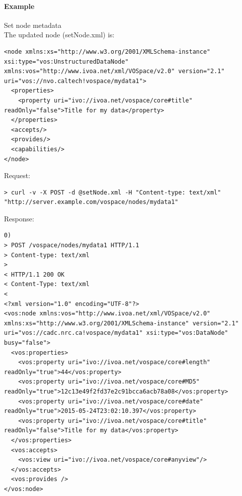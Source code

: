 \documentclass[11pt,a4paper]{ivoa}
\begin{document}
\paragraph{Example}
Set node metadata
\\[5px]
\noindent
The updated node (setNode.xml) is:
\begin{lstlisting}
<node xmlns:xs="http://www.w3.org/2001/XMLSchema-instance" xsi:type="vos:UnstructuredDataNode" xmlns:vos="http://www.ivoa.net/xml/VOSpace/v2.0" version="2.1" uri="vos://nvo.caltech!vospace/mydata1">
  <properties>
    <property uri="ivo://ivoa.net/vospace/core#title" readOnly="false">Title for my data</property>
  </properties>
  <accepts/>
  <provides/>
  <capabilities/>
</node>
\end{lstlisting}
Request:
\begin{lstlisting}
> curl -v -X POST -d @setNode.xml -H "Content-type: text/xml" "http://server.example.com/vospace/nodes/mydata1"
\end{lstlisting}
Response:
\begin{lstlisting}0)
> POST /vospace/nodes/mydata1 HTTP/1.1
> Content-type: text/xml
>
< HTTP/1.1 200 OK
< Content-Type: text/xml
<
<?xml version="1.0" encoding="UTF-8"?>
<vos:node xmlns:vos="http://www.ivoa.net/xml/VOSpace/v2.0" xmlns:xs="http://www.w3.org/2001/XMLSchema-instance" version="2.1" uri="vos://cadc.nrc.ca!vospace/mydata1" xsi:type="vos:DataNode" busy="false">
  <vos:properties>
    <vos:property uri="ivo://ivoa.net/vospace/core#length" readOnly="true">44</vos:property>
    <vos:property uri="ivo://ivoa.net/vospace/core#MD5" readOnly="true">12c13e49f2fd37e2c91bcca6acb78a08</vos:property>
    <vos:property uri="ivo://ivoa.net/vospace/core#date" readOnly="true">2015-05-24T23:02:10.397</vos:property>
    <vos:property uri="ivo://ivoa.net/vospace/core#title" readOnly="false">Title for my data</vos:property>
  </vos:properties>
  <vos:accepts>
    <vos:view uri="ivo://ivoa.net/vospace/core#anyview"/>
  </vos:accepts>
  <vos:provides />
</vos:node>
\end{lstlisting}
\end{document}
